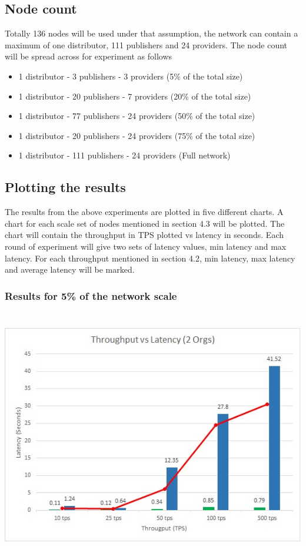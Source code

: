 \documentclass{ceadar_article}
\begin{document}
\subsection {Node count}
Totally 136 nodes will be used under that assumption, the network can contain a maximum of one distributor, 111 publishers and 24 providers. The node count will be spread across for experiment as follows

\begin{itemize}
    \item  1 distributor - 3 publishers - 3 providers (5\% of the total size)
    \item  1 distributor - 20 publishers - 7 providers (20\% of the total size)
    \item  1 distributor - 77 publishers - 24 providers (50\% of the total size)
    \item  1 distributor - 20 publishers - 24 providers (75\% of the total size)
    \item  1 distributor - 111 publishers - 24 providers (Full network)
\end{itemize}

\subsection{Plotting the results}

The results from the above experiments are plotted in five different charts. A chart for each scale set of nodes mentioned in section 4.3 will be plotted. The chart will contain the throughput in TPS plotted vs latency in seconds.
\newline
Each round of experiment will give two sets of latency values, min latency and max latency. For each throughput mentioned in section 4.2, min latency, max latency and average latency will be marked. 

\subsubsection{Results for 5\% of the network scale}
    \includegraphics[width=17cm,height=11cm]{ChartSample}
    
\end{document}
